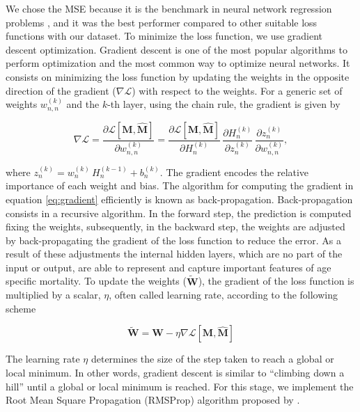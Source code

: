 \documentclass[a4,11pt]{article}
\begin{document}
We chose the MSE because it is the benchmark in neural network regression problems \citep{lecun2015}, and it was the best performer compared to other suitable loss functions with our dataset. To minimize the loss function, we use gradient descent optimization. Gradient descent is one of the most popular algorithms to perform optimization and the most common way to optimize neural networks. It consists on minimizing the loss function by updating the weights in the opposite direction of the gradient ($\nabla \mathcal{L}$) with respect to the weights. For a generic set of weights $w_{n,n}^{(k)}$ and the $k$-th layer, using the chain rule, the gradient is given by

%
\begin{equation}
\label{eq:gradient}
\nabla \mathcal{L} = \frac{\partial \mathcal{L}[\mathbf{M},\mathbf{\hat{M}}]}{\partial w_{n,n}^{(k)}} =\frac{\partial \mathcal{L}[\mathbf{M},\mathbf{\hat{M}}]}{\partial H_n^{(k)}}\,\frac{{\partial H_n^{(k)}}}{\partial z_n^{(k)}} \, \frac{\partial z_n^{(k)}}{\partial w_{n,n}^{(k)}},
\end{equation}
%

where $ z_n^{(k)}=w_{n}^{(k)}\,H_{n}^{(k-1)}+b_n^{(k)}$. The gradient encodes the relative importance of each weight and bias. The algorithm for computing the gradient in equation \eqref{eq:gradient} efficiently is known as back-propagation. Back-propagation consists in a recursive algorithm. In the forward step, the prediction is computed fixing the weights, subsequently, in the backward step, the weights are adjusted by back-propagating the gradient of the loss function to reduce the error. As a result of these adjustments the internal hidden layers, which are no part of the input or output, are able to represent and capture important features of age specific mortality. To update the weights ($\tilde{\mathbf{W}}$), the gradient of the loss function is multiplied by a scalar, $\eta$, often called learning rate, according to the following scheme

%
\begin{equation}
\tilde{\mathbf{W}} = \mathbf{W}-\eta \nabla \mathcal{L} \left[\mathbf{M},\mathbf{\hat{M}}\right]
\end{equation}
%

The learning rate $\eta$ determines the size of the step taken to reach a global or local minimum. In other words, gradient descent is similar to “climbing down a hill” until a global or local minimum is reached. For this stage, we implement the Root Mean Square Propagation (RMSProp) algorithm proposed by \cite{hinton2012neural}.
\end{document}
